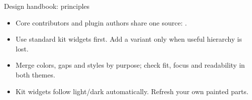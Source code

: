 \begin{standardframe}{Design handbook: principles}
\begin{itemize}
\item Core contributors and plugin authors share one source: .
\item Use standard kit widgets first. Add a variant only when useful hierarchy is lost.
\item Merge colors, gaps and styles by purpose; check fit, focus and readability in both themes.
\item Kit widgets follow light/dark automatically. Refresh your own painted parts.
\end{itemize}
\end{standardframe}
